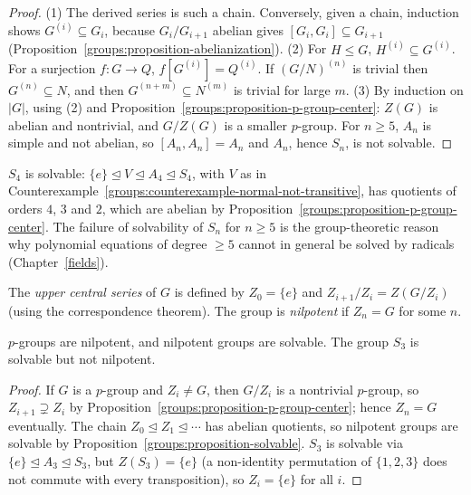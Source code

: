 \begin{proof}
(1) The derived series is such a chain. Conversely, given a chain, induction shows
$G^{(i)} \subseteq G_i$, because $G_i/G_{i+1}$ abelian gives
$[G_i, G_i] \subseteq G_{i+1}$ (Proposition~\ref{groups:proposition-abelianization}).
(2) For $H \leq G$, $H^{(i)} \subseteq G^{(i)}$. For a surjection $f \colon G \to Q$,
$f[G^{(i)}] = Q^{(i)}$. If $(G/N)^{(n)}$ is trivial then $G^{(n)} \subseteq N$, and then
$G^{(n + m)} \subseteq N^{(m)}$ is trivial for large $m$.
(3) By induction on $|G|$, using (2) and
Proposition~\ref{groups:proposition-p-group-center}: $Z(G)$ is abelian and nontrivial,
and $G/Z(G)$ is a smaller $p$-group. For $n \geq 5$, $A_n$ is simple and not abelian,
so $[A_n, A_n] = A_n$ and $A_n$, hence $S_n$, is not solvable.
\end{proof}

\begin{example}\label{groups:example-s4-solvable}
$S_4$ is solvable: $\{e\} \trianglelefteq V \trianglelefteq A_4 \trianglelefteq S_4$, with $V$ as in
Counterexample~\ref{groups:counterexample-normal-not-transitive}, has quotients of
orders $4$, $3$ and $2$, which are abelian by
Proposition~\ref{groups:proposition-p-group-center}. The failure of solvability of
$S_n$ for $n \geq 5$ is the group-theoretic reason why polynomial equations of
degree $\geq 5$ cannot in general be solved by radicals (Chapter~\ref{fields}).
\end{example}

\begin{definition}\label{groups:definition-nilpotent}
The \emph{upper central series} of $G$ is defined by $Z_0 = \{e\}$ and
$Z_{i+1}/Z_i = Z(G/Z_i)$ (using the correspondence theorem). The group is
\emph{nilpotent} if $Z_n = G$ for some $n$.
\end{definition}

\begin{proposition}\label{groups:proposition-nilpotent}
$p$-groups are nilpotent, and nilpotent groups are solvable. The group $S_3$ is
solvable but not nilpotent.
\end{proposition}

\begin{proof}
If $G$ is a $p$-group and $Z_i \neq G$, then $G/Z_i$ is a nontrivial $p$-group, so
$Z_{i+1} \supsetneq Z_i$ by Proposition~\ref{groups:proposition-p-group-center}; hence
$Z_n = G$ eventually. The chain $Z_0 \trianglelefteq Z_1 \trianglelefteq \cdots$ has abelian
quotients, so nilpotent groups are solvable by
Proposition~\ref{groups:proposition-solvable}. $S_3$ is solvable via
$\{e\} \trianglelefteq A_3 \trianglelefteq S_3$, but $Z(S_3) = \{e\}$ (a non-identity permutation of
$\{1,2,3\}$ does not commute with every transposition), so $Z_i = \{e\}$ for all $i$.
\end{proof}

